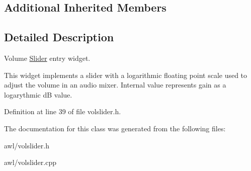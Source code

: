 \subsection*{Additional Inherited Members}


\subsection{Detailed Description}
Volume \hyperlink{class_awl_1_1_slider}{Slider} entry widget. 

This widget implements a slider with a logarithmic floating point scale used to adjust the volume in an audio mixer. Internal value represents gain as a logarythmic dB value. 

Definition at line 39 of file volslider.\+h.



The documentation for this class was generated from the following files\+:\begin{DoxyCompactItemize}
\item 
awl/volslider.\+h\item 
awl/volslider.\+cpp\end{DoxyCompactItemize}

